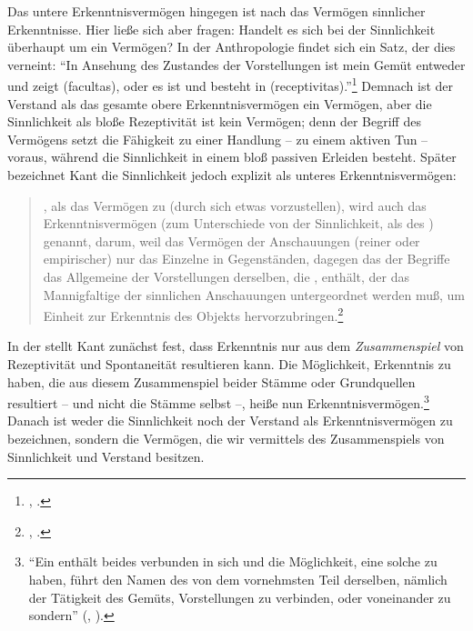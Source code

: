 \label{Abschnitt:IstSinnlichkeiteinErkenntnisvermögen} Das untere
Erkenntnisvermögen hingegen ist nach  das Vermögen sinnlicher Erkenntnisse.
Hier ließe sich aber fragen: Handelt es sich bei der Sinnlichkeit überhaupt um
ein Vermögen? In der Anthropologie findet sich ein Satz, der dies verneint:
\enquote{In Ansehung des Zustandes der Vorstellungen ist mein Gemüt entweder
 und zeigt  (facultas), oder es ist  und besteht in 
(receptivitas).}\footnote{\cite[][BA
25]{Kant:AnthropologieinpragmatischerHinsicht1977},
\cite[][VII: 140.16--18]{Kant:GesammelteWerke1900ff.}.} Demnach ist der Verstand
als das gesamte obere Erkenntnisvermögen ein Vermögen, aber die Sinnlichkeit als bloße
Rezeptivität ist kein Vermögen; denn der Begriff des Vermögens setzt die
Fähigkeit zu einer Handlung -- zu einem aktiven Tun -- voraus, während die
Sinnlichkeit in einem bloß passiven Erleiden besteht. Später bezeichnet Kant die
Sinnlichkeit jedoch explizit als unteres Erkenntnisvermögen:
\begin{quote}
, als das Vermögen zu  (durch  sich
etwas vorzustellen), wird auch das  Erkenntnisvermögen (zum
Unterschiede von der Sinnlichkeit, als des ) genannt, darum, weil
das Vermögen der Anschauungen (reiner oder empirischer) nur das Einzelne in
Gegenständen, dagegen das der Begriffe das Allgemeine der Vorstellungen
derselben, die , enthält, der das Mannigfaltige der sinnlichen
Anschauungen untergeordnet werden muß, um Einheit zur Erkenntnis des Objekts
hervorzubringen.\footnote{\cite[][BA
115]{Kant:AnthropologieinpragmatischerHinsicht1977},
\cite[][VII: 196.17--24]{Kant:GesammelteWerke1900ff.}.}
\end{quote}
In der  stellt Kant zunächst fest, dass Erkenntnis nur aus
dem \emph{Zusammenspiel} von Rezeptivität und Spontaneität resultieren kann. Die
Möglichkeit, Erkenntnis zu haben, die aus diesem Zusammenspiel beider Stämme
oder Grundquellen resultiert -- und nicht die Stämme selbst --, heiße nun
Erkenntnisvermögen.\footnote{\enquote{Ein  enthält beides verbunden in sich und die Möglichkeit, eine solche zu haben, führt den Namen
des  von dem vornehmsten Teil derselben, nämlich der
Tätigkeit des Gemüts, Vorstellungen zu verbinden, oder voneinander zu sondern}
\mkbibparens{\cite[][BA 25]{Kant:AnthropologieinpragmatischerHinsicht1977},
\cite[][VII: 140.18--22]{Kant:GesammelteWerke1900ff.}}.} Danach ist weder die
Sinnlichkeit noch der Verstand als Erkenntnisvermögen zu bezeichnen, sondern die Vermögen, die wir
vermittels des Zusammenspiels von Sinnlichkeit und Verstand besitzen. 

